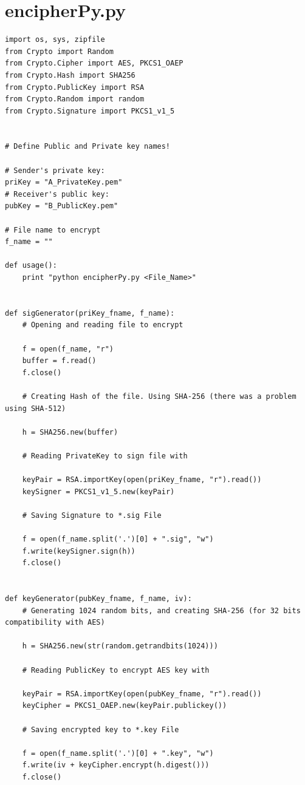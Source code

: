 \documentclass[a4paper,11pt,openright,oneside]{report}
\begin{document}
\appendix
\newpage
\section{encipherPy.py}
\label{App:encipher.py}

\begin{verbatim}
import os, sys, zipfile
from Crypto import Random
from Crypto.Cipher import AES, PKCS1_OAEP
from Crypto.Hash import SHA256
from Crypto.PublicKey import RSA
from Crypto.Random import random
from Crypto.Signature import PKCS1_v1_5


# Define Public and Private key names!

# Sender's private key:
priKey = "A_PrivateKey.pem"
# Receiver's public key:
pubKey = "B_PublicKey.pem"

# File name to encrypt
f_name = ""

def usage():
    print "python encipherPy.py <File_Name>"


def sigGenerator(priKey_fname, f_name):
    # Opening and reading file to encrypt

    f = open(f_name, "r")
    buffer = f.read()
    f.close()

    # Creating Hash of the file. Using SHA-256 (there was a problem using SHA-512)

    h = SHA256.new(buffer)

    # Reading PrivateKey to sign file with

    keyPair = RSA.importKey(open(priKey_fname, "r").read())
    keySigner = PKCS1_v1_5.new(keyPair)

    # Saving Signature to *.sig File

    f = open(f_name.split('.')[0] + ".sig", "w")
    f.write(keySigner.sign(h))
    f.close()


def keyGenerator(pubKey_fname, f_name, iv):
    # Generating 1024 random bits, and creating SHA-256 (for 32 bits compatibility with AES)

    h = SHA256.new(str(random.getrandbits(1024)))

    # Reading PublicKey to encrypt AES key with

    keyPair = RSA.importKey(open(pubKey_fname, "r").read())
    keyCipher = PKCS1_OAEP.new(keyPair.publickey())

    # Saving encrypted key to *.key File

    f = open(f_name.split('.')[0] + ".key", "w")
    f.write(iv + keyCipher.encrypt(h.digest()))
    f.close()


\end{verbatim}
\end{document}
